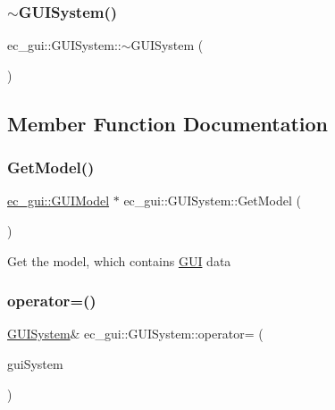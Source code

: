 \subsubsection{\texorpdfstring{$\sim$\+G\+U\+I\+System()}{~GUISystem()}}
{\footnotesize\ttfamily ec\+\_\+gui\+::\+G\+U\+I\+System\+::$\sim$\+G\+U\+I\+System (\begin{DoxyParamCaption}{ }\end{DoxyParamCaption})}



\subsection{Member Function Documentation}
\mbox{\label{classec__gui_1_1_g_u_i_system_a1b1d6de0a467c72bc7a2dc3fcef72e95}} 
\subsubsection{\texorpdfstring{Get\+Model()}{GetModel()}}
{\footnotesize\ttfamily \mbox{\hyperlink{classec__gui_1_1_g_u_i_model}{ec\+\_\+gui\+::\+G\+U\+I\+Model}} $\ast$ ec\+\_\+gui\+::\+G\+U\+I\+System\+::\+Get\+Model (\begin{DoxyParamCaption}{ }\end{DoxyParamCaption})}

Get the model, which contains \mbox{\hyperlink{classec__gui_1_1_g_u_i}{G\+UI}} data \mbox{\label{classec__gui_1_1_g_u_i_system_a7fd5c98407d1dccd0640c9fe26431166}} 
\subsubsection{\texorpdfstring{operator=()}{operator=()}\hspace{0.1cm}{\footnotesize\ttfamily [1/2]}}
{\footnotesize\ttfamily \mbox{\hyperlink{classec__gui_1_1_g_u_i_system}{G\+U\+I\+System}}\& ec\+\_\+gui\+::\+G\+U\+I\+System\+::operator= (\begin{DoxyParamCaption}\item[{const \mbox{\hyperlink{classec__gui_1_1_g_u_i_system}{G\+U\+I\+System}} \&}]{gui\+System }\end{DoxyParamCaption})\hspace{0.3cm}{\ttfamily [delete]}}

